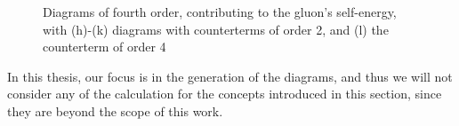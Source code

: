 \documentclass[11pt,a4paper,twoside,pdf]{article}
\numberwithin{equation}{section}
\begin{document}
\begin{figure}[h!]
\begin{subfigure}[t]{0.19\textwidth}
    \end{subfigure}

    \caption{Diagrams of fourth order, contributing to the gluon's self-energy,
    with (h)-(k) diagrams with counterterms of order 2, and (l) the counterterm 
    of order 4}
    \label{fig:order4_1to1}
    
\end{figure}

In this thesis, our focus is in the generation of the diagrams, and thus we will not
consider any of the calculation for the concepts introduced in this section, since
they are beyond the scope of this work.

\end{document}
